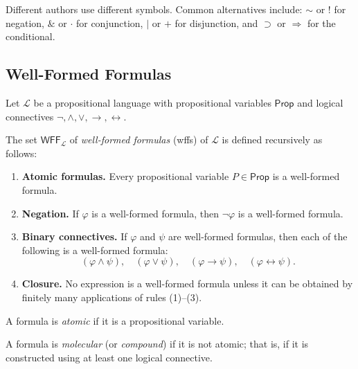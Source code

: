 \begin{remark}
Different authors use different symbols. Common alternatives include:
$\sim$ or $!$ for negation, $\&$ or $\cdot$ for conjunction, $|$ or $+$ for
disjunction, and $\supset$ or $\Rightarrow$ for the conditional.
\end{remark}

\subsection{Well-Formed Formulas}

\begin{definition}
Let $\mathcal{L}$ be a propositional language with propositional variables
$\mathsf{Prop}$ and logical connectives $\neg, \wedge, \vee, \rightarrow,
\leftrightarrow$.

The set $\mathsf{WFF}_{\mathcal{L}}$ of \emph{well-formed formulas} (wffs) of
$\mathcal{L}$ is defined recursively as follows:

\begin{enumerate}
  \item \textbf{Atomic formulas.}
  Every propositional variable $P \in \mathsf{Prop}$ is a well-formed formula.

  \item \textbf{Negation.}
  If $\varphi$ is a well-formed formula, then $\neg \varphi$ is a well-formed
  formula.

  \item \textbf{Binary connectives.}
  If $\varphi$ and $\psi$ are well-formed formulas, then each of the following
  is a well-formed formula:
  \[
  (\varphi \wedge \psi), \quad
  (\varphi \vee \psi), \quad
  (\varphi \rightarrow \psi), \quad
  (\varphi \leftrightarrow \psi).
  \]

  \item \textbf{Closure.}
  No expression is a well-formed formula unless it can be obtained by finitely
  many applications of rules (1)--(3).
\end{enumerate}
\end{definition}

\begin{definition}
A formula is \emph{atomic} if it is a propositional variable.

A formula is \emph{molecular} (or \emph{compound}) if it is not atomic; that is,
if it is constructed using at least one logical connective.
\end{definition}

